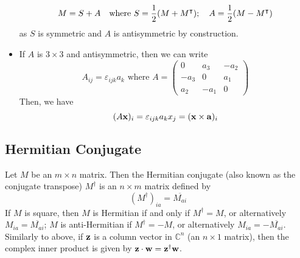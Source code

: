 \begin{itemize}
	      \[
		      M = S + A\quad\text{where } S = \frac{1}{2}(M + M^\intercal);\quad A = \frac{1}{2}(M - M^\intercal)
	      \]
	      as \(S\) is symmetric and \(A\) is antisymmetric by construction.
	\item If \(A\) is \(3 \times 3\) and antisymmetric, then we can write
	      \[
		      A_{ij} = \varepsilon_{ijk}a_k\text{ where } A = \begin{pmatrix}
			      0    & a_3  & -a_2 \\
			      -a_3 & 0    & a_1  \\
			      a_2  & -a_1 & 0
		      \end{pmatrix}
	      \]
	      Then, we have
	      \[
		      (A \vb x)_i = \varepsilon_{ijk}a_k x_j = (\vb x \times \vb a)_i
	      \]
\end{itemize}

\subsection{Hermitian Conjugate}
Let \(M\) be an \(m \times n\) matrix.
Then the Hermitian conjugate (also known as the conjugate transpose) \(M^\dagger\) is an \(n \times m\) matrix defined by
\[
	(M^\dagger)_{ia} = \overline{M_{ai}}
\]
If \(M\) is square, then \(M\) is Hermitian if and only if \(M^\dagger = M\), or alternatively \(M_{ia} = \overline{M_{ai}}\); \(M\) is anti-Hermitian if \(M^\dagger = -M\), or alternatively \(M_{ia} = -\overline{M_{ai}}\).
Similarly to above, if \(\vb z\) is a column vector in \(\mathbb C^n\) (an \(n \times 1\) matrix), then the complex inner product is given by \(\vb z \cdot \vb w = \vb z^\dagger \vb w\).

